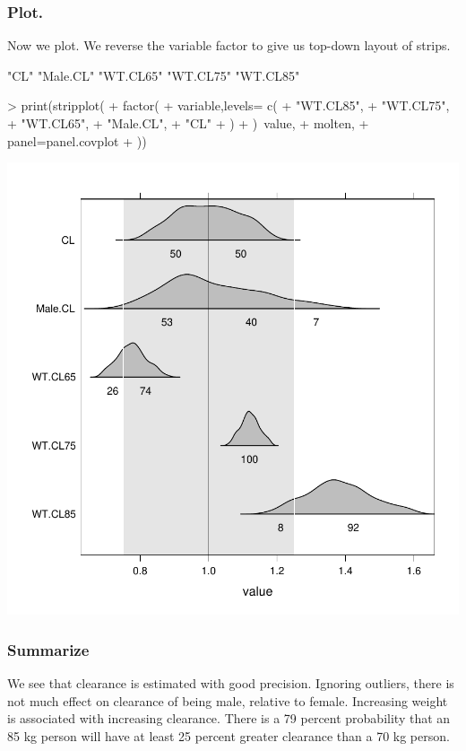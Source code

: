 \subsubsection{Plot.}
Now we plot.  We reverse the variable factor to give us top-down layout
of strips.
\begin{Schunk}
\begin{Soutput}
[1] "CL"      "Male.CL" "WT.CL65" "WT.CL75" "WT.CL85"
\end{Soutput}
\begin{Sinput}
> print(stripplot(
+ 	factor(
+ 		variable,levels= c(
+ 			"WT.CL85",
+ 			"WT.CL75",
+ 			"WT.CL65",
+ 			"Male.CL",
+ 			"CL"
+ 		)
+ 	)~value,
+ 	molten,
+ 	panel=panel.covplot
+ ))
\end{Sinput}
\end{Schunk}
\includegraphics{model1-covplot}
\subsubsection{Summarize}
We see that clearance is estimated with good precision.  Ignoring outliers, there 
is not much effect on clearance of being male, relative to female.  Increasing 
weight is associated with increasing clearance.  There is a 79 percent probability
that an 85 kg person will have at least 25 percent greater clearance than a 70 kg
person.

















